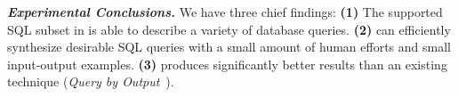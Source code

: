 \vspace{1mm}
\noindent \textbf{\textit{Experimental Conclusions.}}
We have three chief findings: \textbf{(1)}
The supported SQL subset in \ourtool is
able to describe a variety of database queries.
\textbf{(2)} \ourtool can efficiently synthesize desirable SQL
queries with a small amount of human
efforts and small input-output examples.
\textbf{(3)} \ourtool produces significantly better results
than an existing technique (\textit{Query by Output}~\cite{Tran:2009}).




